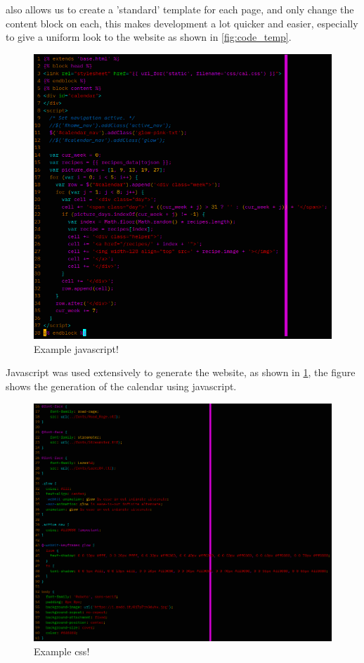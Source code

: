 \documentclass[a4paper]{scrartcl}
\begin{document}
also allows us to create a 'standard' template for each page, and only change
the content block on each, this makes development a lot quicker and easier, especially
to give a uniform look to the website as shown in \ref{fig:code_temp}.
\begin{figure}[H]
  \begin{center}
    \includegraphics[scale=0.8]{images/code_5.png}
    \caption{Example javascript!}
    \label{fig:code_js}
  \end{center}
\end{figure}
\noindent
Javascript was used extensively to generate the website, as shown in \ref{fig:code_js},
the figure shows the generation of the calendar using javascript.
\begin{figure}[H]
  \begin{center}
    \includegraphics[scale=0.8]{images/code_6.png}
    \caption{Example css!}
    \label{fig:code_css}
  \end{center}
\end{figure}
\end{document}
